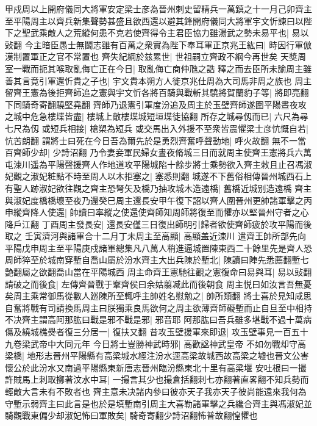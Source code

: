 甲戍周以上開府儀同大將軍安定梁士彦為晉州刺史留精兵一萬鎮之十一月己卯齊主至平陽周主以齊兵新集聲勢甚盛且欲西還以避其鋒開府儀同大將軍宇文忻諫曰以陛下之聖武乘敵人之荒縱何患不克若使齊得令主君臣協力雖湯武之勢未易平也|{
	易以䜴翻}
今主暗臣愚士無鬬志雖有百萬之衆實為陛下奉耳軍正京兆王紘曰|{
	時因行軍倣漢制置軍正之官不常置也}
齊失紀綱於兹累世|{
	世祖嗣立齊政不綱今再世矣}
天奬周室一戰而扼其喉取亂侮亡正在今日|{
	取亂侮亡商仲虺之誥}
釋之而去臣所未諭周主雖善其言竟引軍還忻貴之子也|{
	宇文貴本朔方人徙京兆仕周為大司馬非周之族也}
周主留齊王憲為後拒齊師追之憲與宇文忻各將百騎與戰斬其驍將賀蘭豹子等|{
	將即亮翻下同騎奇寄翻驍堅堯翻}
齊師乃退憲引軍度汾追及周主於玉壁齊師遂圍平陽晝夜攻之城中危急樓堞皆盡|{
	樓城上敵樓堞城短垣堞徒協翻}
所存之城尋仭而已|{
	六尺為尋七尺為仭}
或短兵相接|{
	槍槊為短兵}
或交馬出入外援不至衆皆震懼梁士彦忼慨自若|{
	忼苦朗翻}
謂將士曰死在今日吾為爾先於是勇烈齊奮呼聲動地|{
	呼火故翻}
無不一當百齊師少却|{
	少詩沼翻}
乃令妻妾軍民婦女晝夜脩城三日而就周主使齊王憲將兵六萬屯涑川遥為平陽聲援齊人作地道攻平陽城陷十餘步將士乘勢欲入齊主敕且止召馮淑妃觀之淑妃粧點不時至周人以木拒塞之|{
	塞悉則翻}
城遂不下舊俗相傳晉州城西石上有聖人跡淑妃欲往觀之齊主恐弩矢及橋乃抽攻城木造遠橋|{
	舊橋近城别造遠橋}
齊主與淑妃度橋橋壞至夜乃還癸巳周主還長安甲午復下詔以齊人圍晉州更帥諸軍擊之丙申縱齊降人使還|{
	帥讀曰率縱之使還使齊師知周師將復至而懼亦以堅晉州守者之心降戶江翻}
丁酉周主發長安|{
	還長安僅三日復出師明引歸者欲使齊師疲於攻平陽而後取之}
壬寅濟河與諸軍合十二月丁未周主至高顯|{
	高顯盖近涑川}
遣齊王帥所部先向平陽戊申周主至平陽庚戍諸軍總集凡八萬人稍進逼城置陳東西二十餘里先是齊人恐周師猝至於城南穿塹自喬山屬於汾水齊主大出兵陳於塹北|{
	陳讀曰陣先悉薦翻塹七艶翻屬之欲翻喬山當在平陽城西}
周主命齊王憲馳往觀之憲復命曰易與耳|{
	易以䜴翻}
請破之而後食|{
	左傳齊晉戰于鞌齊侯曰余姑翦㓕此而後朝食}
周主悦曰如汝言吾無憂矣周主乘常御馬從數人廵陳所至輒呼主帥姓名慰勉之|{
	帥所類翻}
將士喜於見知咸思自奮將戰有司請換馬周主曰朕獨乘良馬欲何之周主欲薄齊師礙塹而止自旦至中相持不决齊主謂高阿那肱曰戰是邪不戰是邪|{
	邪音耶}
阿那肱曰吾兵雖多堪戰不過十萬病傷及繞城樵㸑者復三分居一|{
	復扶又翻}
昔攻玉壁援軍來即退|{
	攻玉壁事見一百五十九卷梁武帝中大同元年}
今日將士豈勝神武時邪|{
	高歡諡神武皇帝}
不如勿戰却守高梁橋|{
	地形志晉州平陽縣有高梁城水經注汾水逕高梁故城西故高梁之墟也晉文公害懷公於此汾水又南過平陽縣東新唐志晉州臨汾縣東北十里有高梁堰}
安吐根曰一撮許賊馬上刺取擲著汶水中耳|{
	一撮言其少也撮倉括翻刺七亦翻著直畧翻不知兵勢而輕敵大言未有不敗者也}
齊主意未决諸内參曰彼亦天子我亦天子彼尚能遠來我何為守塹示弱齊主曰此言是也於是填塹南引周主大喜勒諸軍擊之兵纔合齊主與馮淑妃並騎觀戰東偏少却淑妃怖曰軍敗矣|{
	騎奇寄翻少詩沼翻怖普故翻惶懼也}
